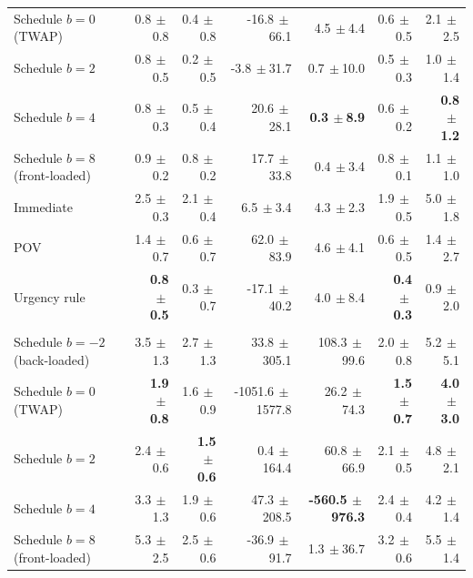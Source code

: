 \begin{table}[!htbp]
\begin{tabular}{lrrrrrr}
Schedule $b=0$ (TWAP) & 0.8{\tiny$\,\pm$0.8} & 0.4{\tiny$\,\pm$0.8} & -16.8{\tiny$\,\pm$66.1} & 4.5{\tiny$\,\pm$4.4} & 0.6{\tiny$\,\pm$0.5} & 2.1{\tiny$\,\pm$2.5} \\
Schedule $b=2$ & 0.8{\tiny$\,\pm$0.5} & 0.2{\tiny$\,\pm$0.5} & -3.8{\tiny$\,\pm$31.7} & 0.7{\tiny$\,\pm$10.0} & 0.5{\tiny$\,\pm$0.3} & 1.0{\tiny$\,\pm$1.4} \\
Schedule $b=4$ & 0.8{\tiny$\,\pm$0.3} & 0.5{\tiny$\,\pm$0.4} & 20.6{\tiny$\,\pm$28.1} & \textbf{0.3{\tiny$\,\pm$8.9}} & 0.6{\tiny$\,\pm$0.2} & \textbf{0.8{\tiny$\,\pm$1.2}} \\
Schedule $b=8$ (front-loaded) & 0.9{\tiny$\,\pm$0.2} & 0.8{\tiny$\,\pm$0.2} & 17.7{\tiny$\,\pm$33.8} & 0.4{\tiny$\,\pm$3.4} & 0.8{\tiny$\,\pm$0.1} & 1.1{\tiny$\,\pm$1.0} \\
Immediate & 2.5{\tiny$\,\pm$0.3} & 2.1{\tiny$\,\pm$0.4} & 6.5{\tiny$\,\pm$3.4} & 4.3{\tiny$\,\pm$2.3} & 1.9{\tiny$\,\pm$0.5} & 5.0{\tiny$\,\pm$1.8} \\
POV & 1.4{\tiny$\,\pm$0.7} & 0.6{\tiny$\,\pm$0.7} & 62.0{\tiny$\,\pm$83.9} & 4.6{\tiny$\,\pm$4.1} & 0.6{\tiny$\,\pm$0.5} & 1.4{\tiny$\,\pm$2.7} \\
Urgency rule & \textbf{0.8{\tiny$\,\pm$0.5}} & 0.3{\tiny$\,\pm$0.7} & -17.1{\tiny$\,\pm$40.2} & 4.0{\tiny$\,\pm$8.4} & \textbf{0.4{\tiny$\,\pm$0.3}} & 0.9{\tiny$\,\pm$2.0} \\
\addlinespace
\multicolumn{7}{l}{\emph{Parent order = 20\% of background volume}} \\
Schedule $b=-2$ (back-loaded) & 3.5{\tiny$\,\pm$1.3} & 2.7{\tiny$\,\pm$1.3} & 33.8{\tiny$\,\pm$305.1} & 108.3{\tiny$\,\pm$99.6} & 2.0{\tiny$\,\pm$0.8} & 5.2{\tiny$\,\pm$5.1} \\
Schedule $b=0$ (TWAP) & \textbf{1.9{\tiny$\,\pm$0.8}} & 1.6{\tiny$\,\pm$0.9} & -1051.6{\tiny$\,\pm$1577.8} & 26.2{\tiny$\,\pm$74.3} & \textbf{1.5{\tiny$\,\pm$0.7}} & \textbf{4.0{\tiny$\,\pm$3.0}} \\
Schedule $b=2$ & 2.4{\tiny$\,\pm$0.6} & \textbf{1.5{\tiny$\,\pm$0.6}} & 0.4{\tiny$\,\pm$164.4} & 60.8{\tiny$\,\pm$66.9} & 2.1{\tiny$\,\pm$0.5} & 4.8{\tiny$\,\pm$2.1} \\
Schedule $b=4$ & 3.3{\tiny$\,\pm$1.3} & 1.9{\tiny$\,\pm$0.6} & 47.3{\tiny$\,\pm$208.5} & \textbf{-560.5{\tiny$\,\pm$976.3}} & 2.4{\tiny$\,\pm$0.4} & 4.2{\tiny$\,\pm$1.4} \\
Schedule $b=8$ (front-loaded) & 5.3{\tiny$\,\pm$2.5} & 2.5{\tiny$\,\pm$0.6} & -36.9{\tiny$\,\pm$91.7} & 1.3{\tiny$\,\pm$36.7} & 3.2{\tiny$\,\pm$0.6} & 5.5{\tiny$\,\pm$1.4} \\

\end{tabular}
\end{table}
